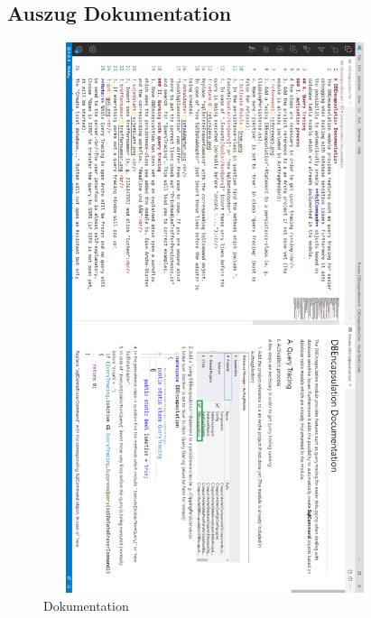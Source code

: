 \documentclass[11pt,toc=sectionentrywithoutdots, 
headheight=44pt, headings=optiontoheadandtoc, hyperfootnotes=false, hypertexnames=false]{scrartcl}
\begin{document}
\subsection{Auszug Dokumentation}
 \label{fig:Dokumentation}
 \begin{figure}[H]
 \centering

	\includegraphics[height=610, width=380]{doku.png}
	 \caption{Dokumentation}
 \end{figure}
\end{document}
